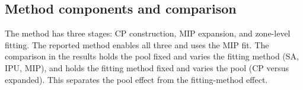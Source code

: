\documentclass[review]{elsarticle}
\makeatletter
\newcommand{\gls}[1]{\csname acr@#1\endcsname}
\makeatother
\begin{document}




\subsection{Method components and comparison}
\label{sec:strategy_roles}
The method has three stages: CP construction, MIP expansion, and zone-level
fitting. The reported method enables all three and
uses the MIP fit. The comparison in the results holds the pool fixed and varies
the fitting method (SA, IPU, MIP), and holds the fitting method fixed and varies
the pool (CP versus expanded). This separates the pool effect from the
fitting-method effect.
\end{document}
